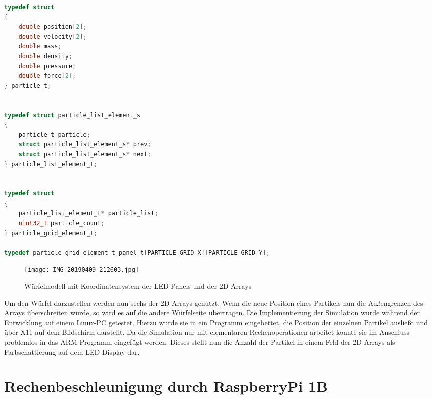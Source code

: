 \begin{lstlisting}[language={c}, caption={Datenstrukturen der SPH}, label={code.sph.structs}]
typedef struct
{
	double position[2];
	double velocity[2];
	double mass;
	double density;
	double pressure;
	double force[2];
} particle_t;


typedef struct particle_list_element_s
{
	particle_t particle;
	struct particle_list_element_s* prev;
	struct particle_list_element_s* next;
} particle_list_element_t;


typedef struct
{
	particle_list_element_t* particle_list;
	uint32_t particle_count;
} particle_grid_element_t;

typedef particle_grid_element_t panel_t[PARTICLE_GRID_X][PARTICLE_GRID_Y];
\end{lstlisting}

\begin{wrapfigure}{r}{0.5\textwidth}
	\centering
	\texttt{[image: IMG\_20190409\_212603.jpg]}
	\caption{Würfelmodell mit Koordinatensystem der LED-Panels und der 2D-Arrays}
	\label{fig:sph:cube_model}
\end{wrapfigure}

Um den Würfel darzustellen werden nun sechs der 2D-Arrays genutzt. Wenn die neue Position eines Partikels nun die Außengrenzen des Arrays überschreiten würde, so wird es auf die andere Würfelseite übertragen. Die Implementierung der Simulation wurde während der Entwicklung auf einem Linux-PC getestet. Hierzu wurde sie in ein Programm eingebettet, die Position der einzelnen Partikel ausließt und über X11 auf dem Bildschirm darstellt. Da die Simulation nur mit elementaren Rechenoperationen arbeitet konnte sie im Anschluss problemlos in das ARM-Programm eingefügt werden. Dieses stellt nun die Anzahl der Partikel in einem Feld der 2D-Arrays als Farbschattierung auf dem LED-Display dar.

\section{Rechenbeschleunigung durch RaspberryPi 1B}

\clearpage